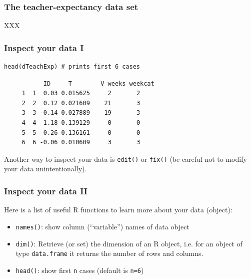 \documentclass[bigger]{beamer}
\begin{document}
\begin{frame}
\frametitle{The teacher-expectancy data set}
\label{sec-3-1-3}

    XXX
\end{frame}
\begin{frame}[fragile]
\frametitle{Inspect your data I}
\label{sec-3-1-4}


\lstset{language=R}
\begin{lstlisting}
head(dTeachExp) # prints first 6 cases
\end{lstlisting}

\begin{verbatim}
           ID     T        V weeks weekcat
     1  1  0.03 0.015625     2       2
     2  2  0.12 0.021609    21       3
     3  3 -0.14 0.027889    19       3
     4  4  1.18 0.139129     0       0
     5  5  0.26 0.136161     0       0
     6  6 -0.06 0.010609     3       3
\end{verbatim}

    Another way to inspect your data is \texttt{edit()} or \texttt{fix()} (be careful not to
    modify your data unintentionally). 
\end{frame}
\begin{frame}
\frametitle{Inspect your data II}
\label{sec-3-1-5}

    Here is a list of useful R functions to learn more about your data (object):
\begin{itemize}
\item \texttt{names()}: show column (\enquote{variable}) names of data object
\item \texttt{dim()}: Retrieve (or set) the dimension of an R object, i.e. for an
      object of type \texttt{data.frame} it returns the number of rows and columns.
\item \texttt{head()}: show first \texttt{n} cases (default is \texttt{n=6})
\end{itemize}
\end{frame}
\end{document}
